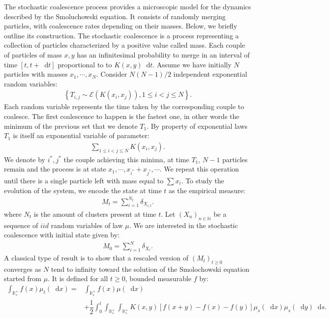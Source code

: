 \documentclass[11pt,a4paper]{article}
\newcommand{\RRP}{\mathbb{R}^+_*}
\newcommand{\Proc}[1]{\left(#1\right)_{t\geq 0}}
\newcommand{\Seq}[1]{\left(#1\right)_{n\in \mathbb{N}}}
\newcommand{\dd}{\mathop{}\!\mathrm{d}}
\begin{document}
The stochastic coalescence process provides a microscopic model for the dynamics described by the Smoluchowski equation. It consists of randomly merging particles, with coalescence rates depending on their masses. Below, we briefly outline its construction. The stochastic coalescence is a process representing a collection of particles characterized by a positive value called mass. Each couple of particles of mass $x,y$ has an infinitesimal probability to merge in an interval of time $[t, t + \dd t]$ proportional to to $K(x,y)\dd t$. Assume we have initially $N$ particles with masses $x_{1},\cdots,x_{N}$. Consider $N(N-1)/2$ independent exponential random variables:
\begin{align*}
    \left\lbrace T_{i,j} \sim \mathcal{E}\left(K(x_{i},x_{j})\right), 1 \leq i < j \leq N \right\rbrace.
\end{align*}
Each random variable represents the time taken by the corresponding couple to coalesce. The first coalescence to happen is the fastest one, in other words the minimum of the previous set that we denote $T_1$. By property of exponential laws $T_1$ is itself an exponential variable of parameter:
\begin{align*}
    \sum\limits_{1 \leq i < j \leq N}K(x_{i},x_{j}).
\end{align*}
We denote by $i^*,j^*$ the couple achieving this minima, at time $T_1$, $N-1$ particles remain and the process is at state $x_{1},\cdots , x_{i^*}+x_{j^*},\cdots$. We repeat this operation until there is a single particle left with mass equal to $\sum\limits x_i$. To study the evolution of the system, we encode the state at time $t$ as the empirical measure:
\begin{align*}
    M_t = \sum\limits_{i = 1}^{N_t} \delta_{X_{i,t}}.
\end{align*}
where $N_t$ is the amount of clusters present at time $t$. Let $\Seq{X_n}$ be a sequence of $iid$ random variables of law $\mu$. We are interested in the stochastic coalescence with initial state given by:
\begin{align*}
    M_0 = \sum\limits_{i = 1}^N \delta_{X_i}.
\end{align*}
A classical type of result is to show that a rescaled version of $\Proc{M_t}$ converges as $N$ tend to infinity toward the solution of the Smolochowski equation started from $\mu$. It is defined for all $t \geq 0$, bounded measurable $f$ by:
\begin{equation}\label{eq:SCE}
    \begin{aligned}
    \int_{\RRP} f(x)\mu_t (\dd x) =& \int_{\RRP} f(x)\mu (\dd x)\\
     &+ \dfrac12\int_0^t \int_{\RRP}\int_{\RRP} 
        K(x,y)\left[f(x+y) - f(x) - f(y)\right] \mu_s(\dd x)\mu_s(\dd y) \dd s.
    \end{aligned}
\end{equation}
\end{document}
